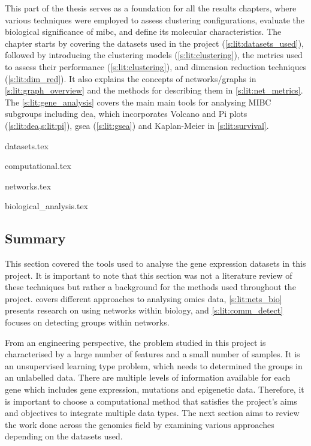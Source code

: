 This part of the thesis serves as a foundation for all the results chapters, where various techniques were employed to assess clustering configurations, evaluate the biological significance of \acrshort{mibc}, and define its molecular characteristics. The chapter starts by covering the datasets used in the project (\cref{s:lit:datasets_used}), followed by introducing the clustering models (\cref{s:lit:clustering}), the metrics used to assess their performance (\cref{s:lit:clustering}), and dimension reduction techniques (\cref{s:lit:dim_red}). It also explains the concepts of networks/graphs in \cref{s:lit:graph_overview} and the methods for describing them in \cref{s:lit:net_metrics}. The \cref{s:lit:gene_analysis} covers the main main tools for analysing MIBC subgroups including \acrfull{dea}, which incorporates Volcano and Pi plots (\cref{s:lit:dea,s:lit:pi}), \acrfull{gsea} (\cref{s:lit:gsea}) and Kaplan-Meier in \cref{s:lit:survival}.



{datasets.tex}

{computational.tex}

{networks.tex}

{biological_analysis.tex}



\subsection{Summary} \label{s:lit:choosing_ml}


This section covered the tools used to analyse the gene expression datasets in this project. It is important to note that this section was not a literature review of these techniques but rather a background for the methods used throughout the project.  covers different approaches to analysing omics data, \cref{s:lit:nets_bio} presents research on using networks within biology, and \cref{s:lit:comm_detect} focuses on detecting groups within networks.

From an engineering perspective, the problem studied in this project is characterised by a large number of features and a small number of samples. It is an unsupervised learning type problem, which needs to determined the groups in an unlabelled data. There are multiple levels of information available for each gene which includes gene expression, mutations and epigenetic data. Therefore, it is important to choose a computational method that satisfies the project's aims and objectives to integrate multiple data types. The next section aims to review the work done across the genomics field by examining various approaches depending on the datasets used.
